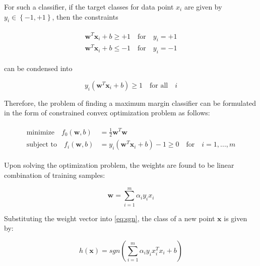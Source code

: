 For such a classifier, if the target classes for data point $x_i$ are given by $y_i \in \left\lbrace -1, +1 \right\rbrace$, then the constraints

\begin{align}
\begin{aligned}
\mathbf{w}^{T}\mathbf{x}_i + b \geq +1 \quad \text{for} \quad y_i = +1 \\
\mathbf{w}^{T}\mathbf{x}_i + b \leq -1 \quad \text{for} \quad y_i = -1
\end{aligned}
\end{align}

can be condensed into

$$
y_i (\mathbf{w}^{T}\mathbf{x}_i + b) \geq 1 \quad \text{for all} \quad i
$$

Therefore, the problem of finding a maximum margin classifier can be formulated in the form of constrained convex optimization problem as follows:

\begin{align}
\begin{aligned}
\text{minimize} \quad f_0(\mathbf{w},b) &= \frac{1}{2} \mathbf{w}^{T} \mathbf{w} \\
\text{subject to} \quad f_i(\mathbf{w},b) &= y_i (\mathbf{w}^{T}\mathbf{x}_i + b) -1 \geq 0 \quad \text{for} \quad i = 1,...,m
\end{aligned}
\end{align}

Upon solving the optimization problem, the weights are found to be linear combination of training samples:

$$
\mathbf{w} = \sum^{m}_{i=1} \alpha_i y_i x_i
$$

Substituting the weight vector into \ref{eq:sgn}, the class of a new point $\mathbf{x}$ is given by:

$$
h(\mathbf{x}) = sgn(\sum^{m}_{i=1} \alpha_i y_i x_i^{T} x_i + b)
$$

